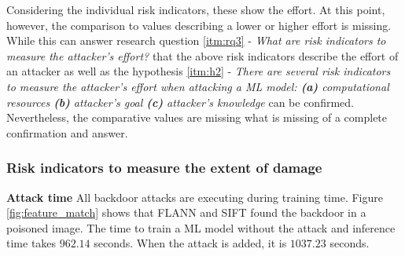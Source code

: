 Considering the individual risk indicators, these show the effort. At this point, however, the comparison to values describing a lower or higher effort is missing. While this can answer research question \ref{itm:rq3} - \textit{What are risk indicators to measure the attacker's effort?} that the above risk indicators describe the effort of an attacker as well as the hypothesis \ref{itm:h2} - \textit{There are several risk indicators to measure the attacker's effort when attacking a ML model: \textbf{(a)} computational resources \textbf{(b)} attacker's goal \textbf{(c)} attacker's knowledge} can be confirmed. Nevertheless, the comparative values are missing what is missing of a complete confirmation and answer.

\subsubsection*{Risk indicators to measure the extent of damage}

\noindent\textbf{Attack time} All backdoor attacks are executing during training time. Figure \ref{fig:feature_match} shows that FLANN and SIFT found the backdoor in a poisoned image. The time to train a ML model without the attack and inference time takes $962.14$ seconds. When the attack is added, it is $1037.23$ seconds.


